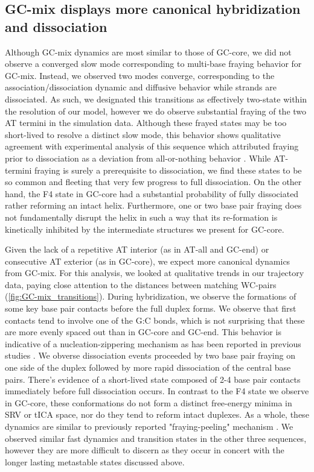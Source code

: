 \documentclass[journal=jpcbfk,manuscript=article]{achemso}
\begin{document}
\subsection{GC-mix displays more canonical hybridization and dissociation}
Although GC-mix dynamics are most similar to those of GC-core, we did not observe a converged slow mode corresponding to multi-base fraying behavior for GC-mix. Instead, we observed two modes converge, corresponding to the association/dissociation dynamic and diffusive behavior while strands are dissociated. As such, we designated this transitions as effectively two-state within the resolution of our model, however we do observe substantial fraying of the two AT termini in the simulation data. Although these frayed states may be too short-lived to resolve a distinct slow mode, this behavior shows qualitative agreement with experimental analysis of this sequence which attributed fraying prior to dissociation as a deviation from all-or-nothing behavior \citep{Sanstead2016}.  While AT-termini fraying is surely a prerequisite to dissociation, we find these states to be so common and fleeting that very few progress to full dissociation. On the other hand, the F4 state in GC-core had a substantial probability of fully dissociated rather reforming an intact helix. Furthermore, one or two base pair fraying does not fundamentally disrupt the helix in such a way that its re-formation is kinetically inhibited by the intermediate structures we present for GC-core.  

Given the lack of a repetitive AT interior (as in AT-all and GC-end) or consecutive AT exterior (as in GC-core), we expect more canonical dynamics from GC-mix. For this analysis, we looked at qualitative trends in our trajectory data, paying close attention to the distances between matching WC-pairs (\ref{fig:GC-mix_transitions}). During hybridization, we observe the formations of some key base pair contacts before the full duplex forms. We observe that first contacts tend to involve one of the G:C bonds, which is not surprising that these are more evenly spaced out than in GC-core and GC-end. This behavior is indicative of a nucleation-zippering mechanism as has been reported in previous studies \citep{Wetmur1968KineticsDNA, Porschke1971CooperativeTransition, Yin2011KineticsHybridization}. We obverse dissociation events proceeded by two base pair fraying on one side of the duplex followed by more rapid dissociation of the central base pairs. There's evidence of a short-lived state composed of 2-4 base pair contacts immediately before full dissociation occurs. In contrast to the F4 state we observe in GC-core, these conformations do not form a distinct free-energy minima in SRV or tICA space, nor do they tend to reform intact duplexes. As a whole, these dynamics are similar to previously reported "fraying-peeling" mechanism \citep{Wong2008TheSimulations, Perez2010Real-timeUnfolding, Zgarbova2014BaseRNA}. We observed similar fast dynamics and transition states in the other three sequences, however they are more difficult to discern as they occur in concert with the longer lasting metastable states discussed above.
\end{document}
